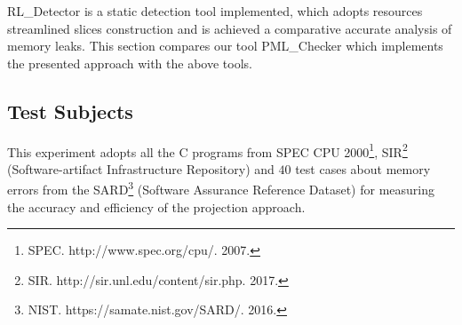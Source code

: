 RL\_Detector is a static detection tool implemented, which adopts resources streamlined slices construction and is achieved a comparative accurate analysis of memory leaks. This section compares our tool PML\_Checker which implements the presented approach with the above tools.
\subsection{Test Subjects}\label{ssec:ts}
This experiment adopts all the C programs from SPEC CPU 2000\footnote{SPEC. http://www.spec.org/cpu/. 2007.}, SIR\footnote{SIR. http://sir.unl.edu/content/sir.php. 2017.} (Software-artifact Infrastructure Repository) and $40$ test cases about memory errors from the SARD\footnote{NIST. https://samate.nist.gov/SARD/. 2016.} (Software Assurance Reference Dataset) for measuring the accuracy and efficiency of the projection approach. 


